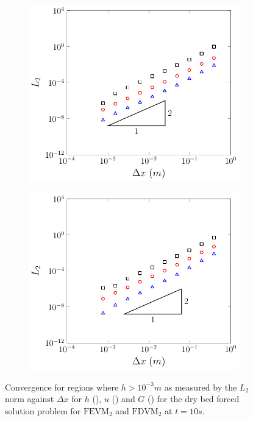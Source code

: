 \begin{figure}
	\centering
	\begin{subfigure}{0.5\textwidth}
		\includegraphics[width=\textwidth]{./chp5/figures/Forced/Dry/FEVML2red.pdf}
		\vspace{0.5cm}
	\end{subfigure}%
	\begin{subfigure}{0.5\textwidth}
		\includegraphics[width=\textwidth]{./chp5/figures/Forced/Dry/FDVML2red.pdf}
		\vspace{0.5cm}
	\end{subfigure}
	\caption{Convergence for regions where $h > 10^{-3}m$ as measured by the $L_2$ norm against $\Delta x$ for $h$ (), $u$ () and $G$ () for the dry bed forced solution problem for $\text{FEVM}_2$ and $\text{FDVM}_2$ at $t=10s$.}
	\label{fig:ForcedSolDryL1restrict}
\end{figure}


